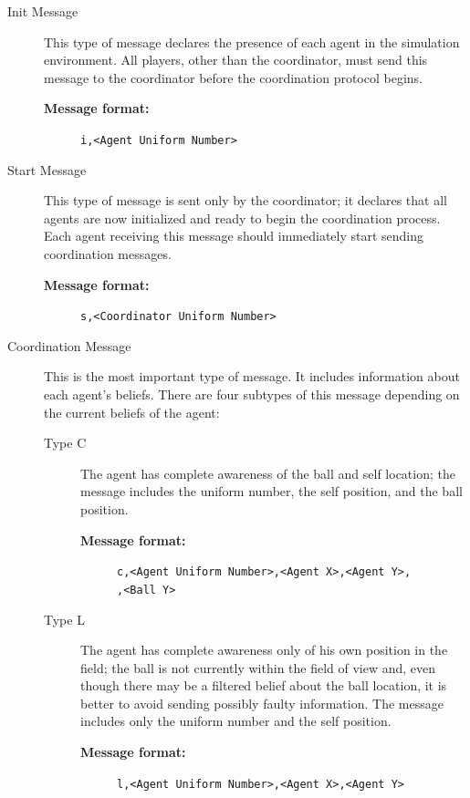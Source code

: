 \begin{description}
\item[Init Message] This type of message declares the presence of each agent in the simulation environment. All players, other than the coordinator, must send this message to the coordinator before the coordination protocol begins.
\begin{description}
  \item[{\bf Message format:}] 
  \texttt{i,<Agent Uniform Number> }
\end{description}

\item[Start Message] This type of message is sent only by the coordinator; it declares that all agents are now initialized and ready to begin the coordination process. Each agent receiving this message should immediately start sending coordination messages.

\begin{description}
  \item[{\bf Message format:}] 
  \texttt{s,<Coordinator Uniform Number>}
\end{description}

\item[Coordination Message] This is the most important type of message. It includes information about each agent's beliefs. There are four subtypes of this message depending on  the current beliefs of the agent:
\begin{description}

\item[Type C] The agent has complete awareness of the ball and self location; the message includes the uniform number, the self position, and the ball position.

\begin{description}
  \item[{\bf Message format:}]
  \texttt{c,<Agent Uniform Number>,<Agent X>,<Agent Y>,\\<Ball X>,<Ball Y>}
\end{description}

\item[Type L] The agent has complete awareness only of his own position in the field; the ball is not currently within the field of view and, even though there may be a filtered belief about the ball location, it is better to avoid sending possibly faulty information. The message includes only the uniform number and the self position.

\begin{description}
  \item[{\bf Message format:}]
  \texttt{l,<Agent Uniform Number>,<Agent X>,<Agent Y>}
\end{description}


\end{description}
\end{description}
